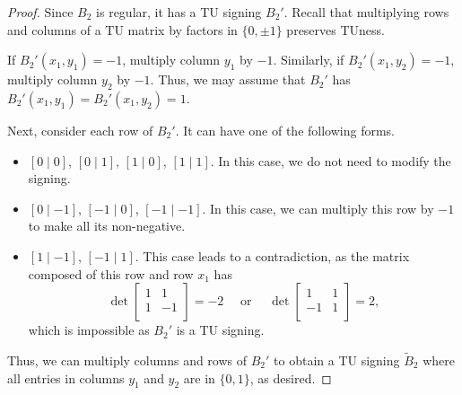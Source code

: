 \documentclass{article}
\theoremstyle{definition}
\begin{document}
\begin{proof}
    Since $B_{2}$ is regular, it has a TU signing $B_{2}'$. Recall that multiplying rows and columns of a TU matrix by factors in $\{0, \pm 1\}$ preserves TUness.

    If $B_{2}'(x_{1}, y_{1}) = -1$, multiply column $y_{1}$ by $-1$. Similarly, if $B_{2}'(x_{1}, y_{2}) = -1$, multiply column $y_{2}$ by $-1$. Thus, we may assume that $B_{2}'$ has $B_{2}'(x_{1}, y_{1}) = B_{2}'(x_{1}, y_{2}) = 1$.

    Next, consider each row of $B_{2}'$. It can have one of the following forms.
    \begin{itemize}
        \item $[0 \mid 0]$, $[0 \mid 1]$, $[1 \mid 0]$, $[1 \mid 1]$. In this case, we do not need to modify the signing.
        \item $[0 \mid -1]$, $[-1 \mid 0]$, $[-1 \mid -1]$. In this case, we can multiply this row by $-1$ to make all its non-negative.
        \item $[1 \mid -1]$, $[-1 \mid 1]$. This case leads to a contradiction, as the matrix composed of this row and row $x_{1}$ has
        \[
            \det \begin{bmatrix}
                1 & 1 \\
                1 & -1 \\
            \end{bmatrix} = -2
            \quad \text{ or } \quad
            \det \begin{bmatrix}
                1 & 1 \\
                -1 & 1 \\
            \end{bmatrix} = 2,
        \]
        which is impossible as $B_{2}'$ is a TU signing.
    \end{itemize}

    Thus, we can multiply columns and rows of $B_{2}'$ to obtain a TU signing $\tilde{B}_{2}$ where all entries in columns $y_{1}$ and $y_{2}$ are in $\{0, 1\}$, as desired.
\end{proof}
\end{document}
